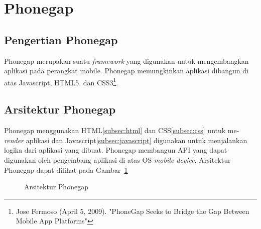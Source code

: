 \section{Phonegap}
\label{sec:phonegap}

\subsection{Pengertian Phonegap}
\label{sec:pengertianphonegap}

Phonegap merupakan suatu \textit{framework} yang digunakan untuk mengembangkan aplikasi pada perangkat mobile. Phonegap memungkinkan aplikasi dibangun di atas Javascript, HTML5, dan CSS3\footnote{Jose Fermoso (April 5, 2009). "PhoneGap Seeks to Bridge the Gap Between Mobile App Platforms"}.

\subsection{Arsitektur Phonegap}
\label{sec:arsitekturphoengap}

Phonegap menggunakan HTML\ref{subsec:html} dan CSS\ref{subsec:css} untuk me-\textit{render} aplikasi dan Javascript\ref{subsec:javascript} digunakan untuk menjalankan logika dari aplikasi yang dibuat. Phonegap membangun API yang dapat digunakan oleh pengembang aplikasi di atas OS \textit{mobile device}. Arsitektur Phonegap dapat dilihat pada Gambar~\ref{fig:arsitektur_phonegap} 

\begin{figure}[h]
\centering
{}
\caption[Arsitektur Phonegap]{Arsitektur Phonegap} 
\label{fig:arsitektur_phonegap}
\end{figure}

